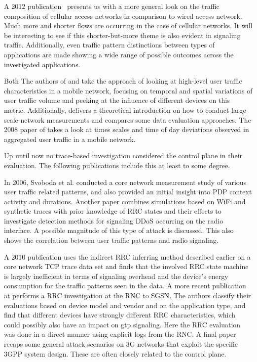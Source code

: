 A 2012 publication~\cite{Zhang:2012:UCC:2377677.2377764} presents us with a more general look on the traffic composition of cellular access networks in comparison to wired access network. Much more and shorter flows are occurring in the case of cellular networks.
It will be interesting to see if this shorter-but-more theme is also evident in signaling traffic. Additionally, even traffic pattern distinctions between types of applications are made showing a wide range of possible outcomes across the investigated applications.

Both The authors of \cite{shafiq2011characterizing} and \cite{paul2011understanding} take the approach of looking at high-level user traffic characteristics in a mobile network, focusing on temporal and spatial variations of user traffic volume and peeking at the influence of different devices on this metric. Additionally, \cite{baer2011two} delivers a theoretical introduction on how to conduct large scale network measurements and compares some data evaluation approaches. The 2008 paper of \cite{4570772} takes a look at times scales and time of day deviations observed in aggregated user traffic in a mobile network.

Up until now no trace-based investigation considered the control plane in their evaluation. The following publications include this at least to some degree.

In 2006, Svoboda et al. \cite{svoboda2006composition} conducted a core network measurement study of various user traffic related patterns, and also provided an initial insight into \gls{PDP} context activity and durations. Another paper \cite{lee2007detection} combines simulations based on WiFi and synthetic traces with prior knowledge of \gls{RRC} states and their effects to investigate detection methods for signaling \gls{DDoS} occurring on the radio interface. A possible magnitude of this type of attack is discussed. This also shows the correlation between user traffic patterns and radio signaling.

A 2010 publication\cite{Qian:2010:CRR:1879141.1879159} uses the indirect \gls{RRC} inferring method described earlier on a core network TCP trace data set and finds that the involved \gls{RRC} state machine is largely inefficient in terms of signaling overhead and the device's energy consumption for the traffic patterns seen in the data. 
A more recent publication at \cite{he2012panoramic} performs a \gls{RRC} investigation at the \gls{RNC} to \gls{SGSN}. The authors classify their evaluations based on device model and vendor and on the application type, and find that different devices have strongly different \gls{RRC} characteristics, which could possibly also have an impact on \gls{gtp} signaling. Here the \gls{RRC} evaluation was done in a direct manner using explicit logs from the \gls{RNC}. A final paper \cite{Ricciato2010551} recaps some general attack scenarios on \gls{3G} networks that exploit the specific \gls{3GPP} system design. These are often closely related to the control plane.


